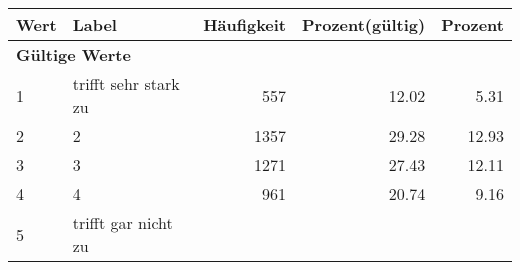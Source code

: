      \begin{longtable}{lXrrr}
     \toprule
     \textbf{Wert} & \textbf{Label} & \textbf{Häufigkeit} & \textbf{Prozent(gültig)} & \textbf{Prozent} \\
     \endhead
     \midrule
     \multicolumn{5}{l}{\textbf{Gültige Werte}}\\

     1 &
     \multicolumn{1}{X}{ trifft sehr stark zu   } &


       \num{557} &
       \num[round-mode=places,round-precision=2]{12.02} &
         \num[round-mode=places,round-precision=2]{5.31} \\

     2 &
     \multicolumn{1}{X}{ 2   } &


       \num{1357} &
       \num[round-mode=places,round-precision=2]{29.28} &
         \num[round-mode=places,round-precision=2]{12.93} \\

     3 &
     \multicolumn{1}{X}{ 3   } &


       \num{1271} &
       \num[round-mode=places,round-precision=2]{27.43} &
         \num[round-mode=places,round-precision=2]{12.11} \\

     4 &
     \multicolumn{1}{X}{ 4   } &


       \num{961} &
       \num[round-mode=places,round-precision=2]{20.74} &
         \num[round-mode=places,round-precision=2]{9.16} \\

     5 &
     \multicolumn{1}{X}{ trifft gar nicht zu   } &



\end{longtable}
